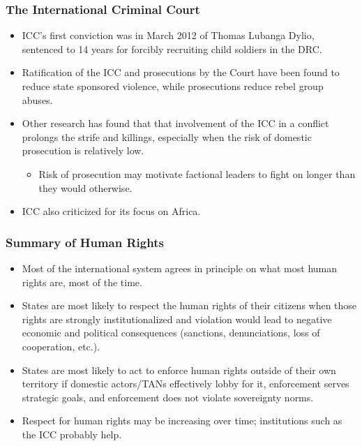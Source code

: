 \documentclass{beamer}
\begin{document}
\begin{frame} 
	\frametitle{\LARGE{The International Criminal Court}}
	\begin{itemize}
		\item ICC's first conviction was in March 2012 of Thomas Lubanga Dylio, sentenced to 14 years for forcibly recruiting child soldiers in the DRC. \pause
		\item Ratification of the ICC and prosecutions by the Court have been found to reduce state sponsored violence, while prosecutions reduce rebel group abuses. \pause
		\item Other research has found that that involvement of the ICC in a conflict prolongs the strife and killings, especially when the risk of domestic prosecution is relatively low.
		\begin{itemize}
			\item Risk of prosecution may motivate factional leaders to fight on longer than they would otherwise.
		\end{itemize}
		\item ICC also criticized for its focus on Africa.	
	\end{itemize}
\end{frame}

\begin{frame} 
	\frametitle{\LARGE{Summary of Human Rights}}
	\begin{itemize}
		\item Most of the international system agrees in principle on what most human rights are, most of the time. \pause
		\item States are most likely to respect the human rights of their citizens when those rights are strongly institutionalized and violation would lead to negative economic and political consequences (sanctions, denunciations, loss of cooperation, etc.). \pause
		\item States are most likely to act to enforce human rights outside of their own territory if domestic actors/TANs effectively lobby for it, enforcement serves strategic goals, and enforcement does not violate sovereignty norms. \pause
		\item Respect for human rights may be increasing over time; institutions such as the ICC probably help.
	\end{itemize}
\end{frame}
\end{document}
